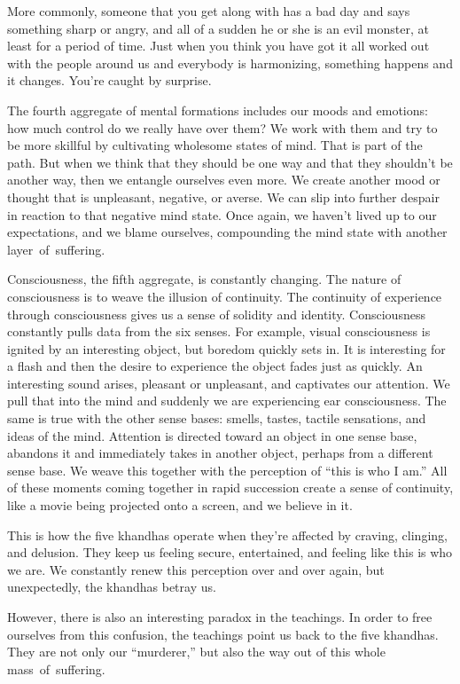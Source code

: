 More commonly, someone that you get along with has a bad day and says something sharp or angry, and all of a sudden he or she is an evil monster, at least for a period of time. Just when you think you have got it all worked out with the people around us and everybody is harmonizing, something happens and it changes. You're caught by surprise.

The fourth aggregate of mental formations includes our moods and emotions: how much control do we really have over them? We work with them and try to be more skillful by cultivating wholesome states of mind. That is part of the path. But when we think that they should be one way and that they shouldn't be another way, then we entangle ourselves even more. We create another mood or thought that is unpleasant, negative, or averse. We can slip into further despair in reaction to that negative mind state. Once again, we haven't lived up to our expectations, and we blame ourselves, compounding the mind state with another \mbox{layer of suffering.}

Consciousness, the fifth aggregate, is constantly changing. The nature of consciousness is to weave the illusion of continuity. The continuity of experience through consciousness gives us a sense of solidity and identity. Consciousness constantly pulls data from the six senses. For example, visual consciousness is ignited by an interesting object, but boredom quickly sets in. It is interesting for a flash and then the desire to experience the object fades just as quickly. An interesting sound arises, pleasant or unpleasant, and captivates our attention. We pull that into the mind and suddenly we are experiencing ear consciousness. The same is true with the other sense bases: smells, tastes, tactile sensations, and ideas of the mind. Attention is directed toward an object in one sense base, abandons it and immediately takes in another object, perhaps from a different sense base. We weave this together with the perception of ``this is who I am.'' All of these moments coming together in rapid succession create a sense of continuity, like a movie being projected onto a screen, and we believe in it.

This is how the five khandhas operate when they're affected by craving, clinging, and delusion. They keep us feeling secure, entertained, and feeling like this is who we are. We constantly renew this perception over and over again, but unexpectedly, the khandhas betray us.

However, there is also an interesting paradox in the teachings. In order to free ourselves from this confusion, the teachings point us back to the five khandhas. They are not only our ``murderer,'' but also the way out of this whole \mbox{mass of suffering.}


